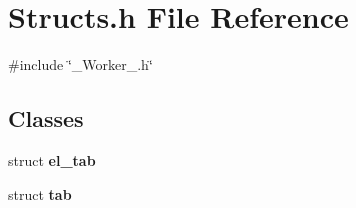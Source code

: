 \section{Structs.\+h File Reference}
\label{_structs_8h}
{\ttfamily \#include \char`\"{}\+\_\+\+Worker\+\_\+.\+h\char`\"{}}\newline
\subsection*{Classes}
\begin{DoxyCompactItemize}
\item 
struct \textbf{ el\+\_\+tab}
\item 
struct \textbf{ tab}
\end{DoxyCompactItemize}
